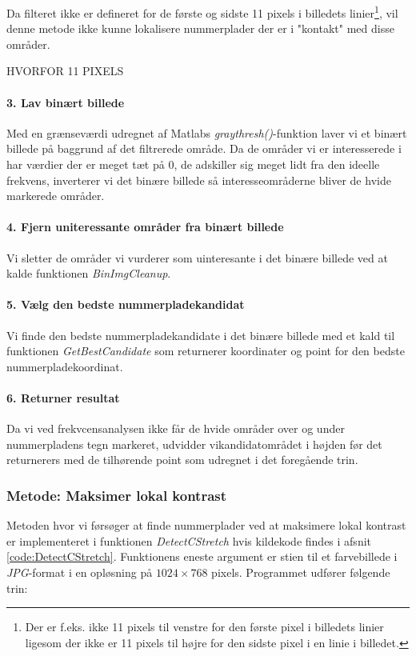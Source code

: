 Da filteret ikke er defineret for de første og sidste 11 pixels i billedets linier\footnote{Der er f.eks. ikke 11 pixels til venstre for den første pixel i billedets linier ligesom der ikke er 11 pixels til højre for den sidste pixel i en linie i billedet.}, vil denne metode ikke kunne lokalisere nummerplader der er i "kontakt" med disse områder.

HVORFOR 11 PIXELS
\paragraph{3. Lav binært billede}
Med en grænseværdi udregnet af Matlabs \textit{graythresh()}-funktion laver vi et binært billede på baggrund af det filtrerede område. Da de områder vi er interesserede i har værdier der er meget tæt på 0, de adskiller sig meget lidt fra den ideelle frekvens, inverterer vi det binære billede så interesseområderne bliver de hvide markerede områder. 

\paragraph{4. Fjern uniteressante områder fra binært billede}
Vi sletter de områder vi vurderer som uinteresante i det binære billede ved at kalde funktionen \textit{BinImgCleanup}.

\paragraph{5. Vælg den bedste nummerpladekandidat}
Vi finde den bedste nummerpladekandidate i det binære billede med et kald til funktionen \textit{GetBestCandidate} som returnerer koordinater og point for den bedste nummerpladekoordinat.

\paragraph{6. Returner resultat}
Da vi ved frekvcensanalysen ikke får de hvide områder over og under nummerpladens tegn markeret, udvidder vikandidatområdet i højden før det returnerers med de tilhørende point som udregnet i det foregående trin.


\subsubsection{Metode: Maksimer lokal kontrast}
Metoden hvor vi førsøger at finde nummerplader ved at maksimere lokal kontrast er implementeret i funktionen \textit{DetectCStretch} hvis kildekode findes i afsnit \vref{code:DetectCStretch}. Funktionens eneste argument er stien til et farvebillede i \textit{JPG}-format i en opløsning på $1024 \times 768$ pixels. Programmet udfører følgende trin:

